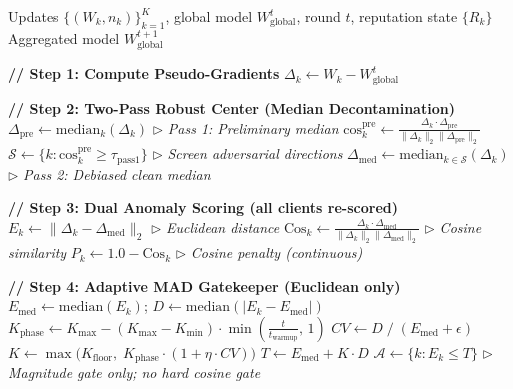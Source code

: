 \documentclass[10pt, conference]{IEEEtran}
\begin{document}
\begin{algorithm}[htbp]
\caption{AEGIS: Two-Pass Byzantine-Resilient Aggregation with Soft Directional Penalty}
\label{alg:aegis}
\begin{algorithmic}[1]

\REQUIRE Updates $\{(W_k, n_k)\}_{k=1}^{K}$, global model $W^t_{\text{global}}$, round $t$, reputation state $\{R_k\}$
\ENSURE Aggregated model $W^{t+1}_{\text{global}}$

\STATE \textbf{// Step 1: Compute Pseudo-Gradients}
    \STATE $\Delta_k \leftarrow W_k - W^t_{\text{global}}$
\ENDFOR

\STATE

\STATE \textbf{// Step 2: Two-Pass Robust Center (Median Decontamination)}
\STATE $\Delta_{\text{pre}} \leftarrow \text{median}_k(\Delta_k)$ \hfill $\triangleright$ \textit{Pass 1: Preliminary median}
    \STATE $\text{cos}^{\text{pre}}_k \leftarrow \frac{\Delta_k \cdot \Delta_{\text{pre}}}{\|\Delta_k\|_2 \|\Delta_{\text{pre}}\|_2}$
\ENDFOR
\STATE $\mathcal{S} \leftarrow \{k : \text{cos}^{\text{pre}}_k \geq \tau_{\text{pass1}}\}$ \hfill $\triangleright$ \textit{Screen adversarial directions}
\STATE $\Delta_{\text{med}} \leftarrow \text{median}_{k \in \mathcal{S}}(\Delta_k)$ \hfill $\triangleright$ \textit{Pass 2: Debiased clean median}

\STATE

\STATE \textbf{// Step 3: Dual Anomaly Scoring (all clients re-scored)}
    \STATE $E_k \leftarrow \|\Delta_k - \Delta_{\text{med}}\|_2$ \hfill $\triangleright$ \textit{Euclidean distance}
    \STATE $\text{Cos}_k \leftarrow \frac{\Delta_k \cdot \Delta_{\text{med}}}{\|\Delta_k\|_2 \|\Delta_{\text{med}}\|_2}$ \hfill $\triangleright$ \textit{Cosine similarity}
    \STATE $P_k \leftarrow 1.0 - \text{Cos}_k$ \hfill $\triangleright$ \textit{Cosine penalty (continuous)}
\ENDFOR

\STATE

\STATE \textbf{// Step 4: Adaptive MAD Gatekeeper (Euclidean only)}
\STATE $E_{\text{med}} \leftarrow \text{median}(E_k)$; \quad $D \leftarrow \text{median}(|E_k - E_{\text{med}}|)$
\STATE $K_{\text{phase}} \leftarrow K_{\max} - (K_{\max} - K_{\min}) \cdot \min\!\left(\frac{t}{t_{\text{warmup}}},\, 1\right)$
\STATE $CV \leftarrow D \;/\; (E_{\text{med}} + \epsilon)$
\STATE $K \leftarrow \max\!\big(K_{\text{floor}},\; K_{\text{phase}} \cdot (1 + \eta \cdot CV)\big)$
\STATE $T \leftarrow E_{\text{med}} + K \cdot D$
\STATE $\mathcal{A} \leftarrow \{k : E_k \leq T\}$ \hfill $\triangleright$ \textit{Magnitude gate only; no hard cosine gate}


\end{algorithmic}
\end{algorithm}
\end{document}
